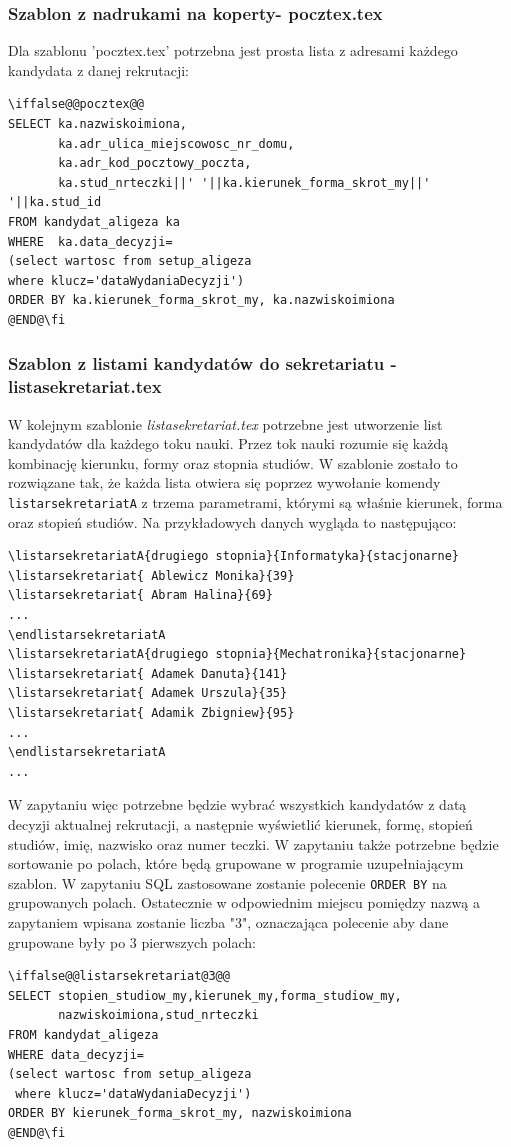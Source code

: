 \subsubsection*{Szablon z nadrukami na koperty- pocztex.tex}
Dla szablonu 'pocztex.tex' potrzebna jest prosta lista z adresami każdego kandydata z danej rekrutacji:


 \begin{lstlisting}
\iffalse@@pocztex@@
SELECT ka.nazwiskoimiona,
       ka.adr_ulica_miejscowosc_nr_domu,
	   ka.adr_kod_pocztowy_poczta,
	   ka.stud_nrteczki||' '||ka.kierunek_forma_skrot_my||' '||ka.stud_id	   
FROM kandydat_aligeza ka 
WHERE  ka.data_decyzji=
(select wartosc from setup_aligeza 
where klucz='dataWydaniaDecyzji')
ORDER BY ka.kierunek_forma_skrot_my, ka.nazwiskoimiona
@END@\fi
\end{lstlisting}

\subsubsection*{Szablon z listami kandydatów do sekretariatu - listasekretariat.tex}
W kolejnym szablonie \emph{listasekretariat.tex} potrzebne jest utworzenie list kandydatów dla każdego toku nauki. Przez tok nauki rozumie się każdą kombinację kierunku, formy oraz stopnia studiów. W szablonie zostało to rozwiązane tak, że każda lista otwiera się poprzez wywołanie komendy \texttt{listarsekretariatA} z trzema parametrami, którymi są właśnie kierunek, forma oraz stopień studiów. Na przykładowych danych wygląda to następująco:
 \begin{lstlisting}
\listarsekretariatA{drugiego stopnia}{Informatyka}{stacjonarne}
\listarsekretariat{ Ablewicz Monika}{39}
\listarsekretariat{ Abram Halina}{69}
...
\endlistarsekretariatA
\listarsekretariatA{drugiego stopnia}{Mechatronika}{stacjonarne}
\listarsekretariat{ Adamek Danuta}{141}
\listarsekretariat{ Adamek Urszula}{35}
\listarsekretariat{ Adamik Zbigniew}{95}
...
\endlistarsekretariatA
...
\end{lstlisting}

W zapytaniu więc potrzebne będzie wybrać wszystkich kandydatów z datą decyzji aktualnej rekrutacji, a następnie wyświetlić kierunek, formę, stopień studiów, imię, nazwisko oraz numer teczki. W zapytaniu także potrzebne będzie sortowanie po polach, które będą grupowane w programie uzupełniającym szablon. W zapytaniu SQL zastosowane zostanie polecenie \texttt{ORDER BY} na grupowanych polach. Ostatecznie w odpowiednim miejscu pomiędzy nazwą a zapytaniem wpisana zostanie liczba "3", oznaczająca polecenie aby dane grupowane były po 3 pierwszych polach:
 \begin{lstlisting}
\iffalse@@listarsekretariat@3@@
SELECT stopien_studiow_my,kierunek_my,forma_studiow_my,
       nazwiskoimiona,stud_nrteczki
FROM kandydat_aligeza
WHERE data_decyzji=
(select wartosc from setup_aligeza
 where klucz='dataWydaniaDecyzji')
ORDER BY kierunek_forma_skrot_my, nazwiskoimiona
@END@\fi
\end{lstlisting}

